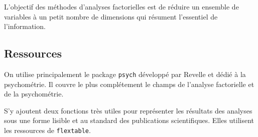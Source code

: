 \documentclass[
]{book}
\begin{document}
L'objectif des méthodes d'analyses factorielles est de réduire un ensemble de variables à un petit nombre de dimensions qui résument l'essentiel de l'information.

\hypertarget{ressources}{%
\subsection{Ressources}\label{ressources}}

On utilise principalement le package \texttt{psych} développé par Revelle et dédié à la psychométrie. Il couvre le plus complétement le champs de l'analyse factorielle et de la psychométrie.

S'y ajoutent deux fonctions très utiles pour représenter les résultats des analyses sous une forme lisible et au standard des publications scientifiques. Elles utilisent les ressources de \texttt{flextable}.
\end{document}
